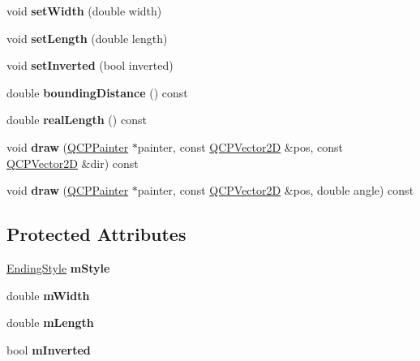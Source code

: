 \begin{DoxyCompactItemize}
\mbox{\label{class_q_c_p_line_ending_a26dc020ea985a72cc25881ce2115e34e}} 
void {\bfseries set\+Width} (double width)
\item 
\mbox{\label{class_q_c_p_line_ending_ae36fa01763751cd64b7f56c3507e935a}} 
void {\bfseries set\+Length} (double length)
\item 
\mbox{\label{class_q_c_p_line_ending_a580e4e2360b35ebb8d68f3494aa2335d}} 
void {\bfseries set\+Inverted} (bool inverted)
\item 
\mbox{\label{class_q_c_p_line_ending_a14fe390ddd590864ac66a60ed5278df5}} 
double {\bfseries bounding\+Distance} () const
\item 
\mbox{\label{class_q_c_p_line_ending_acacd24d386d459b282d3c57f16a5405d}} 
double {\bfseries real\+Length} () const
\item 
\mbox{\label{class_q_c_p_line_ending_a4f45db54f2aba03acf055e29aec1e8e7}} 
void {\bfseries draw} (\hyperlink{class_q_c_p_painter}{Q\+C\+P\+Painter} $\ast$painter, const \hyperlink{class_q_c_p_vector2_d}{Q\+C\+P\+Vector2D} \&pos, const \hyperlink{class_q_c_p_vector2_d}{Q\+C\+P\+Vector2D} \&dir) const
\item 
\mbox{\label{class_q_c_p_line_ending_af7ac30a81ba85b9bded148c6ec387391}} 
void {\bfseries draw} (\hyperlink{class_q_c_p_painter}{Q\+C\+P\+Painter} $\ast$painter, const \hyperlink{class_q_c_p_vector2_d}{Q\+C\+P\+Vector2D} \&pos, double angle) const
\end{DoxyCompactItemize}
\subsection*{Protected Attributes}
\begin{DoxyCompactItemize}
\item 
\mbox{\label{class_q_c_p_line_ending_a4696fc9117b60f1ca7690fcd2ba56611}} 
\hyperlink{class_q_c_p_line_ending_a5ef16e6876b4b74959c7261d8d4c2cd5}{Ending\+Style} {\bfseries m\+Style}
\item 
\mbox{\label{class_q_c_p_line_ending_aca89d21341133c20dc6825c33a5eac48}} 
double {\bfseries m\+Width}
\item 
\mbox{\label{class_q_c_p_line_ending_ae8e1e2566b96c05736cd92662dba8af8}} 
double {\bfseries m\+Length}
\item 
\mbox{\label{class_q_c_p_line_ending_a91306fe771d54c955e0af21af14349d5}} 
bool {\bfseries m\+Inverted}
\end{DoxyCompactItemize}


